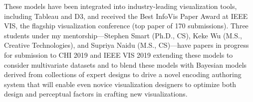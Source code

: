 \documentclass[11pt]{article}
\begin{document}
These models have been integrated into industry-leading visualization tools, including Tableau and D3, and received the Best InfoVis Paper Award at IEEE VIS, the flagship visualization conference (top paper of 170 submissions). Three students under my mentorship---Stephen Smart (Ph.D., CS), Keke Wu (M.S., Creative Technologies), and Supriya Naidu (M.S., CS)---have papers in progress for submission to CHI 2019 and IEEE VIS 2019 extending these models to 
consider multivariate datasets and to blend these models with Bayesian models %
derived from collections of expert designs to drive a novel encoding authoring system that will enable even novice visualization designers to optimize both design and perceptual factors in crafting new visualizations.
\end{document}
